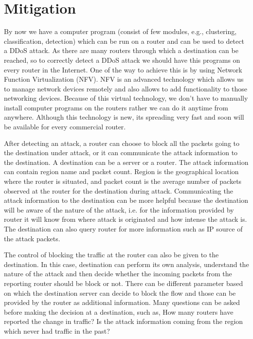 \documentclass[12pt,oneside,a4paper]{article}
\begin{document}
\section{Mitigation}

By now we have a computer program (consist of few modules, e.g., clustering, classification, detection) which can be run on a router and can be used to detect a DDoS attack. As there are many routers through which a destination can be reached, so to correctly detect a DDoS attack we should have this programs on every router in the Internet. One of the way to achieve this is by using Network Function Virtualization (NFV)\cite{nfv}. NFV is an advanced technology which allows us to manage network devices remotely and also allows to add functionality to those networking devices. Because of this virtual technology, we don't have to manually install computer programs on the routers rather we can do it anytime from anywhere. Although this technology is new, its spreading very fast and soon will be available for every commercial router.

After detecting an attack, a router can choose to block all the packets going to the destination under attack, or it can communicate the attack information to the destination. A destination can be a server or a router. The attack information can contain region name and packet count. Region is the geographical location where the router is situated, and packet count is the average number of packets observed at the router for the destination during attack. Communicating the attack information to the destination can be more helpful because the destination will be aware of the nature of the attack, i.e. for the information provided by router it will know from where attack is originated and how intense the attack is. The destination can also query router for more information such as IP source of the attack packets.

The control of blocking the traffic at the router can also be given to the destination. In this case, destination can perform its own analysis, understand the nature of the attack and then decide whether the incoming packets from the reporting router should be block or not. There can be different parameter based on which the destination server can decide to block the flow and those can be provided by the router as additional information. Many questions can be asked before making the decision at a destination, such as, How many routers have reported the change in traffic? Is the attack information coming from the region which never had traffic in the past?
\end{document}
